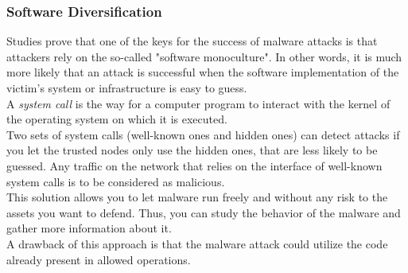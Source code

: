 \subsubsection{Software Diversification}
Studies prove that one of the keys for the success of malware attacks is that attackers rely on the so-called "software monoculture". In other words, it is much more likely that an attack is successful when the software implementation of the victim's system or infrastructure is easy to guess.\\
A \textit{system call} is the way for a computer program to interact with the kernel of the operating system on which it is executed.\\
Two sets of system calls (well-known ones and hidden ones) can detect attacks if you let the trusted nodes only use the hidden ones, that are less likely to be guessed. Any traffic on the network that relies on the interface of well-known system calls is to be considered as malicious.\\
This solution allows you to let malware run freely and without any risk to the assets you want to defend. Thus, you can study the behavior of the malware and gather more information about it.\\
A drawback of this approach is that the malware attack could utilize the code already present in allowed operations.


